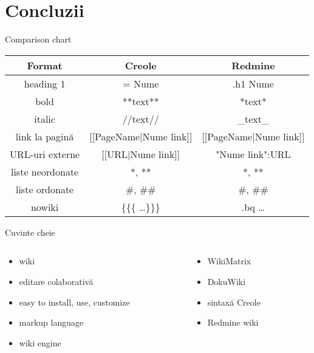 \documentclass{beamer}
\begin{document}
\section{Concluzii}

\frame{\tableofcontents[currentsection]}

\begin{frame}{Comparison chart}
  \begin{center}
    \begin{tabular}{|c|c|c|}
      \hline
      \textbf{Format} & \textbf{Creole} & \textbf{Redmine} \\
      \hline
      \hline
      heading 1 & = Nume & .h1 Nume \\
      bold & **text** & *text* \\
      italic & //text// & \_text\_ \\
      link la pagină & [[PageName$|$Nume link]] & [[PageName$|$Nume link]] \\
      URL-uri externe & [[URL$|$Nume link]] & "Nume link":URL \\
      liste neordonate & *, ** & *, ** \\
      liste ordonate & \#, \#\# & \#, \#\# \\
      nowiki & \{\{\{ \ldots \}\}\} & .bq \ldots \\
      \hline
    \end{tabular}
  \end{center}
\end{frame}

\begin{frame}{Cuvinte cheie}
  \begin{columns}
    \begin{column}[l]{0.5\textwidth}
      \begin{itemize}
        \item wiki
        \item editare colaborativă
        \item easy to install, use, customize
        \item markup language
        \item wiki engine
      \end{itemize}
    \end{column}
    \begin{column}[l]{0.5\textwidth}
      \begin{itemize}
        \item WikiMatrix
        \item DokuWiki
        \item sintaxă Creole
        \item Redmine wiki
      \end{itemize}
    \end{column}
  \end{columns}
\end{frame}
\end{document}
